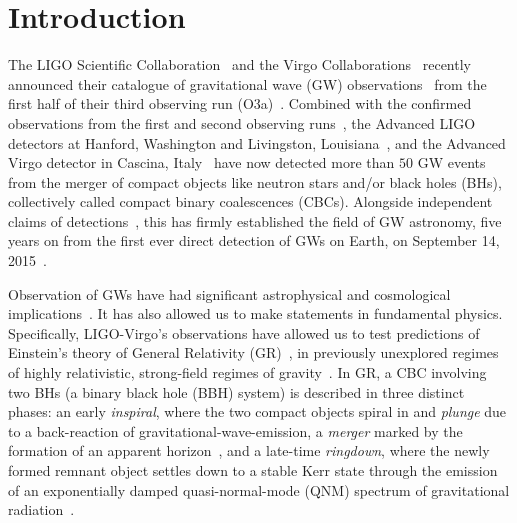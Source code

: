 \documentclass[twocolumn,prd,superscriptaddress,amsfonts,amssymb,amsmath,preprintnumbers]{revtex4-1}
\begin{document}
\section{Introduction}\label{sec:intro}

The LIGO Scientific Collaboration~\citep{lsc} and the Virgo Collaborations~\citep{Virgo} recently announced their catalogue of gravitational wave (GW) observations~\citep{GWTC-2} from the first half of their third observing run (O3a)~\citep{O3reference}. Combined with the confirmed observations from the first and second observing runs~\citep{abbott2019gwtc}, the Advanced LIGO detectors at Hanford, Washington and Livingston, Louisiana~\citep{aasi2015characterization}, and the Advanced Virgo detector in Cascina, Italy~\citep{acernese2014advanced} have now detected more than $50$ GW events from the merger of compact objects like neutron stars and/or black holes (BHs), collectively called compact binary coalescences (CBCs). Alongside independent claims of detections~\citep{nitz20191,nitz20202,2019PhRvD.100b3007Z,2020PhRvD.101h3030V,Venumadhav_2020}, this has firmly established the field of GW astronomy, five years on from the first ever direct detection of GWs on Earth, on September 14, 2015~\citep{abbott2016observation}.
\par
Observation of GWs have had significant astrophysical and cosmological implications~\citep{LSC_2016astroph,gw170817_mma,gw170817_joint,gw170817_hubble}. It has also allowed us to make statements in fundamental physics. Specifically, LIGO-Virgo's observations have allowed us to test predictions of Einstein's theory of General Relativity (GR)~\citep[GR]{}, in previously unexplored regimes of highly relativistic, strong-field regimes of gravity~\citep{LSC_2016grtests,GW170817_TGR,gwtc1_tgr}. In GR, a CBC involving two BHs (a binary black hole (BBH) system) is described in three distinct phases: an early \textit{inspiral}, where the two compact objects spiral in and \textit{plunge} due to a back-reaction of gravitational-wave-emission, a \textit{merger} marked by the formation of an apparent horizon~\citep{NRpaper}, and a late-time \textit{ringdown}, where the newly formed remnant object settles down to a stable Kerr state through the emission of an exponentially damped quasi-normal-mode (QNM) spectrum of gravitational radiation~\citep{vishu,earlyqnmpapers}.  
\par
\end{document}
